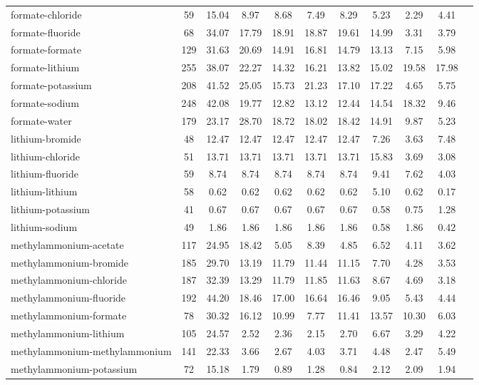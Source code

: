\begin{longtable}{lcccccccccc}
formate-chloride & 59  & 15.04 & 8.97 & 8.68 & 7.49 & 8.29 & 5.23 & 2.29 & 4.41\\
formate-fluoride & 68  & 34.07 & 17.79 & 18.91 & 18.87 & 19.61 & 14.99 & 3.31 & 3.79\\
formate-formate & 129  & 31.63 & 20.69 & 14.91 & 16.81 & 14.79 & 13.13 & 7.15 & 5.98\\
formate-lithium & 255  & 38.07 & 22.27 & 14.32 & 16.21 & 13.82 & 15.02 & 19.58 & 17.98\\
formate-potassium & 208  & 41.52 & 25.05 & 15.73 & 21.23 & 17.10 & 17.22 & 4.65 & 5.75\\
formate-sodium & 248  & 42.08 & 19.77 & 12.82 & 13.12 & 12.44 & 14.54 & 18.32 & 9.46\\
formate-water & 179  & 23.17 & 28.70 & 18.72 & 18.02 & 18.42 & 14.91 & 9.87 & 5.23\\
lithium-bromide & 48  & 12.47 & 12.47 & 12.47 & 12.47 & 12.47 & 7.26 & 3.63 & 7.48\\
lithium-chloride & 51  & 13.71 & 13.71 & 13.71 & 13.71 & 13.71 & 15.83 & 3.69 & 3.08\\
lithium-fluoride & 59  & 8.74 & 8.74 & 8.74 & 8.74 & 8.74 & 9.41 & 7.62 & 4.03\\
lithium-lithium & 58  & 0.62 & 0.62 & 0.62 & 0.62 & 0.62 & 5.10 & 0.62 & 0.17\\
lithium-potassium & 41  & 0.67 & 0.67 & 0.67 & 0.67 & 0.67 & 0.58 & 0.75 & 1.28\\
lithium-sodium & 49  & 1.86 & 1.86 & 1.86 & 1.86 & 1.86 & 0.58 & 1.86 & 0.42\\
methylammonium-acetate & 117  & 24.95 & 18.42 & 5.05 & 8.39 & 4.85 & 6.52 & 4.11 & 3.62\\
methylammonium-bromide & 185  & 29.70 & 13.19 & 11.79 & 11.44 & 11.15 & 7.70 & 4.28 & 3.53\\
methylammonium-chloride & 187  & 32.39 & 13.29 & 11.79 & 11.85 & 11.63 & 8.67 & 4.69 & 3.18\\
methylammonium-fluoride & 192  & 44.20 & 18.46 & 17.00 & 16.64 & 16.46 & 9.05 & 5.43 & 4.44\\
methylammonium-formate & 78  & 30.32 & 16.12 & 10.99 & 7.77 & 11.41 & 13.57 & 10.30 & 6.03\\
methylammonium-lithium & 105  & 24.57 & 2.52 & 2.36 & 2.15 & 2.70 & 6.67 & 3.29 & 4.22\\
methylammonium-methylammonium & 141  & 22.33 & 3.66 & 2.67 & 4.03 & 3.71 & 4.48 & 2.47 & 5.49\\
methylammonium-potassium & 72  & 15.18 & 1.79 & 0.89 & 1.28 & 0.84 & 2.12 & 2.09 & 1.94\\

\end{longtable}
